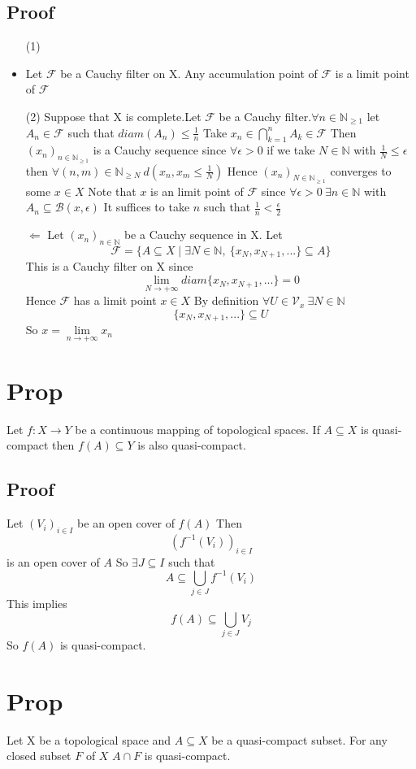\documentclass{book}
\begin{document}
\subsection*{Proof}
\begin{itemize}
    \item [(1)]
    \item Let $\mathcal{F}$ be a Cauchy filter on X. Any accumulation point of $\mathcal{F}$ is a limit point of $\mathcal{F}$
    \item [(2)]Suppose that X is complete.Let $\mathcal{F}$ be a Cauchy filter.$\forall n\in \mathbb{N}_{\geq1}$ let $A_n\in \mathcal{F}$ such that $diam(A_n)\leq\frac{1}{n}$ Take $x_n\in \bigcap\limits_{k=1}^nA_k\in \mathcal{F}$ Then $(x_n)_{n\in \mathbb{N}_{\geq1}}$ is a Cauchy sequence since $\forall \epsilon>0$ if we take $N\in \mathbb{N}$ with $\frac{1}{N}\leq\epsilon$ then $\forall(n,m)\in \mathbb{N}_{\geq N}\ d(x_n,x_m\leq\frac{1}{N})$
    Hence $(x_n)_{N\in \mathbb{N}_{\geq1}}$ converges to some $x\in X$ Note that $x$ is an limit point of $\mathcal{F}$ since $\forall \epsilon>0\ \exists n\in \mathbb{N}$ with $A_n\subseteq\mathcal{B}(x,\epsilon)$ It suffices to take $n$ such that $\frac{1}{n}<\frac{\epsilon}{2}$
    \item[$\Leftarrow$]Let $(x_n)_{n\in \mathbb{N}}$ be a Cauchy sequence in X. Let $$\mathcal{F}=\{A\subseteq X\mid\exists N\in \mathbb{N}
,\ \{x_N,x_{N+1},...\}\subseteq A\}$$
This is a Cauchy filter on X since 
$$\lim\limits_{N\rightarrow +\infty} diam\{x_N,x_{N+1},...\}=0$$
Hence $\mathcal{F}$ has a limit point $x\in X$
By definition $\forall U\in \mathcal{V}_x\ \exists N\in \mathbb{N}$$$\{x_N,x_{N+1},...\}\subseteq U$$
So $x=\lim\limits_{n\rightarrow+\infty}x_n$
\end{itemize}
\section{Prop}
Let $f:X\rightarrow Y$ be a  continuous mapping of topological spaces. If $A\subseteq X$ is quasi-compact then $f(A)\subseteq Y$ is also quasi-compact.
\subsection*{Proof}
Let $(V_i)_{i\in I}$ be an open cover of $f(A)$ Then $$(f^{-1}(V_i))_{i\in I}$$ is an open cover of $A$ So $\exists J\subseteq I$ such that $$A\subseteq \bigcup\limits_{j\in J}f^{-1}(V_i)$$ This implies $$f(A)\subseteq \bigcup\limits_{j\in J}V_j$$ So $f(A)$ is quasi-compact.
\section{Prop}
Let X be a topological space and $A\subseteq X$ be a quasi-compact subset. For any closed subset $F$ of $X$ $A\cap F$ is quasi-compact.
\end{document}
